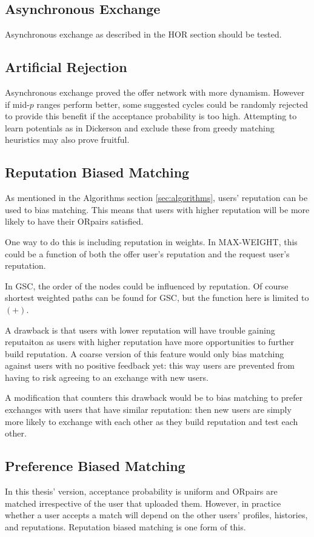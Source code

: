 \documentclass[main.tex]{subfiles}
\begin{document}
\subsection{Asynchronous Exchange}
Asynchronous exchange as described in the HOR section should be tested.

\subsection{Artificial Rejection}
Asynchronous exchange proved the offer network with more dynamism. However if mid-$p$ ranges perform better, some suggested cycles could be randomly rejected to provide this benefit if the acceptance probability is too high. Attempting to learn potentials as in Dickerson \cite{Dick} and exclude these from greedy matching heuristics may also prove fruitful.

\subsection{Reputation Biased Matching}
As mentioned in the Algorithms section \ref{sec:algorithms}, users' reputation can be used to bias matching. This means that users with higher reputation will be more likely to have their ORpairs satisfied.

One way to do this is including reputation in weights. In MAX-WEIGHT, this could be a function of both the offer user's reputation and the request user's reputation.

In GSC, the order of the nodes could be influenced by reputation. Of course shortest weighted paths can be found for GSC, but the function here is limited to $(+)$.

A drawback is that users with lower reputation will have trouble gaining reputaiton as users with higher reputation have more opportunities to further build reputation. A coarse version of this feature would only bias matching against users with no positive feedback yet: this way users are prevented from having to risk agreeing to an exchange with new users.

A modification that counters this drawback would be to bias matching to prefer exchanges with users that have similar reputation: then new users are simply more likely to exchange with each other as they build reputation and test each other.

\subsection{Preference Biased Matching}
In this thesis' version, acceptance probability is uniform and ORpairs are matched irrespective of the user that uploaded them. However, in practice whether a user accepts a match will depend on the other users' profiles, histories, and reputations. Reputation biased matching is one form of this.
\end{document}
